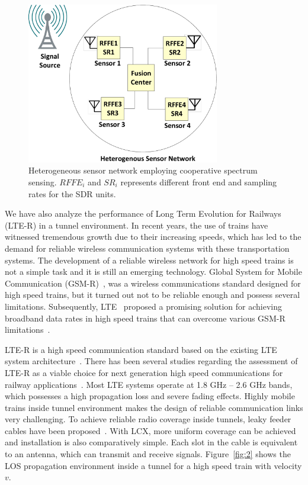 \begin{figure}[!ht]
\label{fig:css}
\centering
\includegraphics[width=0.75\textwidth,keepaspectratio]{images/Gill/figs/introdiag.eps} 
\caption{Heterogeneous sensor network employing cooperative spectrum sensing. $RFFE_i$ and $SR_i$ represents different front end and sampling rates for the SDR units.}
\end{figure}

We have also analyze the performance of Long Term Evolution for Railways (LTE-R) in a tunnel environment. In recent years, the use of trains have witnessed tremendous growth due to their increasing speeds, which has led to the demand for reliable wireless communication systems with these transportation systems. The development of a reliable wireless network for high speed trains is not a simple task and it is still an emerging technology. Global System for Mobile Communication (GSM-R)~\cite{trlter1}, was a wireless communications standard designed for high speed trains, but it turned out not to be reliable enough and possess several limitations. Subsequently, LTE~\cite{trlter2} proposed a promising solution for achieving broadband data rates in high speed trains that can overcome various GSM-R limitations~\cite{arlter3,inplter4}. 

LTE-R is a high speed communication standard based on the existing LTE system architecture~\cite{inplter4}. There has been several studies regarding the assessment of LTE-R as a viable choice for next generation high speed communications for railway applications~\cite{inplter5,inplter6}. Most LTE systems operate at 1.8 GHz -- 2.6 GHz bands, which possesses a high propagation loss and severe fading effects. Highly mobile trains inside tunnel environment makes the design of reliable communication links very challenging. To achieve reliable radio coverage inside tunnels, leaky feeder cables have been proposed~\cite{arlter7}. With LCX, more uniform coverage can be achieved and installation is also comparatively simple. Each slot in the cable is equivalent to an antenna, which can transmit and receive signals. Figure~\ref{fig:2} shows the LOS propagation environment inside a tunnel for a high speed train with velocity $v$.

